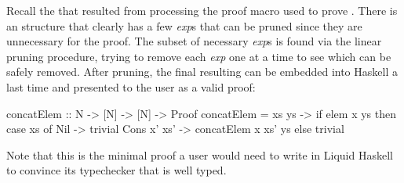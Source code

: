 Recall the \LangBTerm that resulted from processing the proof macro used to prove .
There is an  structure that clearly has a few \textit{exp}s that can be pruned since they are unnecessary for the proof.
The subset of necessary \textit{exp}s is found via the linear pruning procedure, trying to remove each \textit{exp} one at a time to see which can be safely removed.
After pruning, the final resulting \LangBTerm can be embedded into Haskell a last time and presented to the user as a valid proof:

\begin{code}
  concatElem :: N -> [N] -> [N] -> Proof
  concatElem = \x xs ys ->
    if elem x ys then
      case xs of
        Nil -> trivial
        Cons x' xs' -> concatElem x xs' ys
    else
      trivial
\end{code}
%
Note that this is the minimal proof a user would need to write
in Liquid Haskell to convince its typechecker that 
is well typed.



